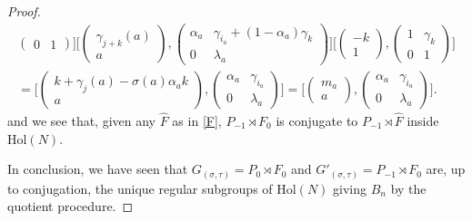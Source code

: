 \documentclass[10pt,a4paper]{amsart}
\newcommand{\Hol}{\mathrm{Hol}}
\begin{document}
\begin{proof}
$$\begin{array}{l}
\begin{pmatrix}
		0&1
		\end{pmatrix}\Big]\Big[\begin{pmatrix}
		\gamma_{j+k}(a)\\
		a
		\end{pmatrix},\begin{pmatrix}
		\alpha_a & \gamma_{i_a}+(1-\alpha_a)\gamma_k\\
		0&\lambda_a
		\end{pmatrix}\Big]
\Big[\begin{pmatrix}
		-k\\
		1
		\end{pmatrix},\begin{pmatrix}
		1 & \gamma_k\\
		0&1
		\end{pmatrix}\Big]\\[12pt]
=\Big[\begin{pmatrix}
		k+\gamma_j(a)-\sigma(a)\alpha_a k\\
		a
		\end{pmatrix},\begin{pmatrix}
	\alpha_a & \gamma_{i_a}\\
		0&\lambda_a
		\end{pmatrix}\Big]
=\Big[\begin{pmatrix}
		m_a\\
		a
		\end{pmatrix},\begin{pmatrix}
	\alpha_a & \gamma_{i_a}\\
		0&\lambda_a
		\end{pmatrix}\Big].
        \end{array}
		$$
and we see that, given any $\hat F$ as in \eqref{F},  $P_{-1}\rtimes F_0$ is conjugate to $P_{-1}\rtimes \hat F$ inside $\Hol(N)$.

In conclusion, we have seen that $G_{(\sigma,\tau)}=P_0\rtimes F_0$ and $G'_{(\sigma,\tau)}=P_{-1}\rtimes F_0$ are, up to conjugation, the unique regular subgroups of $\Hol(N)$ giving $B_n$ by the quotient procedure.
\end{proof}
\end{document}
